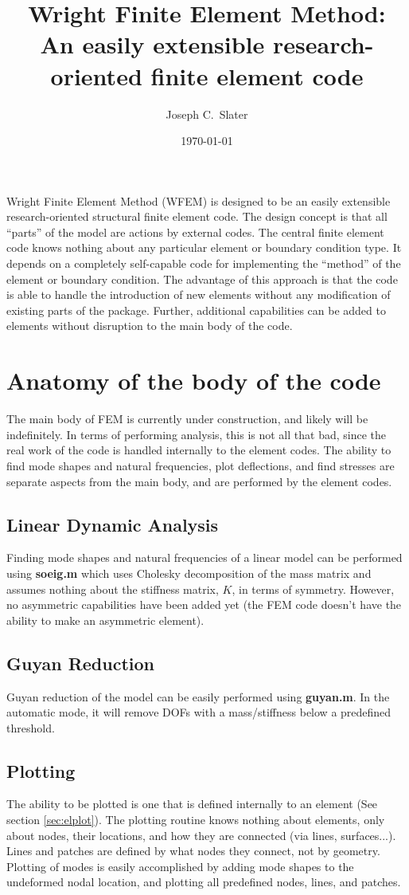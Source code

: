 \documentclass[12pt]{article}
\title{Wright Finite Element Method:\\
  \small{An easily extensible research-oriented finite element code}}
\author{Joseph C.~Slater} \date{\today}
\newcommand*{\filename}[1]{\textsf{\textbf{#1}}}
\begin{document}
\lstset{language=Matlab,numbers=left,numberstyle=\tiny,keywordstyle=\bfseries,escapechar=!}
\maketitle 
\newpage
\tableofcontents
\newpage 
Wright Finite Element Method (WFEM) is designed to be an
easily extensible research-oriented structural finite element code.
The design concept is that all ``parts'' of the model are actions by
external codes. The central finite element code knows nothing about
any particular element or boundary condition type. It depends on a
completely self-capable code for implementing the ``method'' of the
element or boundary condition. The advantage of this approach is that
the code is able to handle the introduction of new elements without
any modification of existing parts of the package. Further, additional
capabilities can be added to elements without disruption to the main
body of the code.

\section{Anatomy of the body of the code}
The main body of FEM is currently under construction, and likely will
be indefinitely. In terms of performing analysis, this is not all that
bad, since the real work of the code is handled internally to the
element codes. The ability to find mode shapes and natural
frequencies, plot deflections, and find stresses are separate aspects
from the main body, and are performed by the element codes.
\subsection{Linear Dynamic Analysis}
Finding mode shapes and natural frequencies of a linear model can be
performed using \filename{soeig.m} which uses Cholesky decomposition
of the mass matrix and assumes nothing about the stiffness matrix,
$K$, in terms of symmetry. However, no asymmetric capabilities have
been added yet (the FEM code doesn't have the ability to make an
asymmetric element).
\subsection{Guyan Reduction}
Guyan reduction of the model can be easily performed using
\filename{guyan.m}. In the automatic mode, it will remove DOFs with a
mass/stiffness below a predefined threshold.
\subsection{Plotting}
The ability to be plotted is one that is defined internally to an
element (See section \ref{sec:elplot}). The plotting routine knows
nothing about elements, only about nodes, their locations, and how
they are connected (via lines, surfaces...). Lines and patches are
defined by what nodes they connect, not by geometry. Plotting of modes
is easily accomplished by adding mode shapes to the undeformed nodal
location, and plotting all predefined nodes, lines, and patches.
\end{document}
